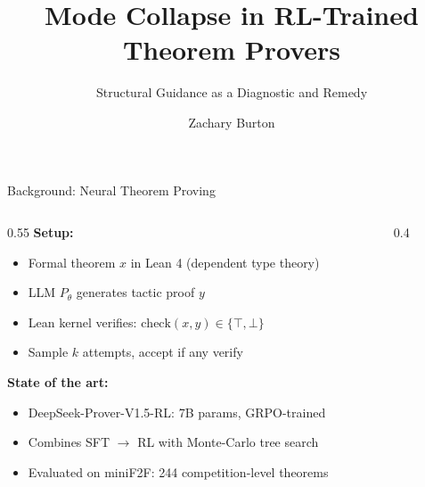 \documentclass[aspectratio=169]{beamer}
\title{Mode Collapse in RL-Trained Theorem Provers}
\subtitle{Structural Guidance as a Diagnostic and Remedy}
\author{Zachary Burton}
\institute{arXiv: 2601.16172}
\date{}
\begin{document}
\begin{frame}
\titlepage
\end{frame}

\begin{frame}{Background: Neural Theorem Proving}
\begin{columns}
\begin{column}{0.55\textwidth}
\textbf{Setup:}
\begin{itemize}
    \item Formal theorem $x$ in Lean 4 (dependent type theory)
    \item LLM $P_\theta$ generates tactic proof $y$
    \item Lean kernel verifies: $\text{check}(x, y) \in \{\top, \bot\}$
    \item Sample $k$ attempts, accept if any verify
\end{itemize}

\vspace{0.5em}
\textbf{State of the art:}
\begin{itemize}
    \item DeepSeek-Prover-V1.5-RL: 7B params, GRPO-trained
    \item Combines SFT $\to$ RL with Monte-Carlo tree search
    \item Evaluated on miniF2F: 244 competition-level theorems
\end{itemize}
\end{column}
\begin{column}{0.4\textwidth}
\centering
{}
\end{column}
\end{columns}
\end{frame}
\end{document}
